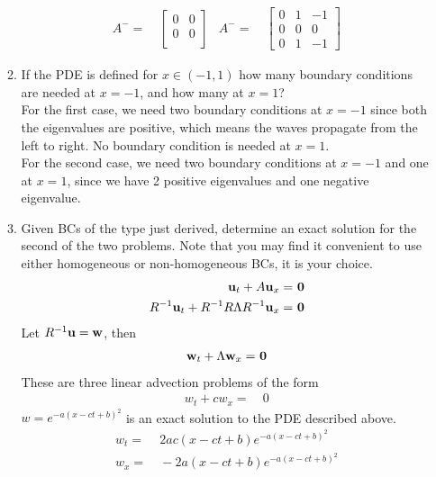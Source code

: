 \documentclass[11pt]{article}
\newcommand{\bu}{{\bf u}}
\newcommand{\bw}{{\bf w}}
\newcommand{\bra}[1]{\left(#1\right)}
\begin{document}
\begin{enumerate}
\begin{enumerate}
\begin{align*}
          A^{-} =& \ 
          \begin{bmatrix}
          0 & 0 \\
          0 & 0 \\
          \end{bmatrix} & 
          A^{-} =& \ 
          \begin{bmatrix}
          0 & 1 & -1 \\
          0 & 0 & 0 \\
          0 & 1 & -1
          \end{bmatrix}
      \end{align*}
    \item {\color{blue}If the PDE is defined for $x\in(-1,1)$ how many boundary conditions are needed at $x=-1$, and how many at $x=1$?} \\
    For the first case, we need two boundary conditions at $x=-1$ since both the eigenvalues are positive, which means the waves propagate from the left to right. No boundary condition is needed at $x=1$. \\
    For the second case, we need two boundary conditions at $x=-1$ and one at $x=1$, since we have 2 positive eigenvalues and one negative eigenvalue.
    \item {\color{blue}Given BCs of the type just derived, determine an exact solution for the second of the two problems. Note that you may find it convenient to use either homogeneous or non-homogeneous BCs, it is your choice.}\\
    \begin{align*}
        \bu_t + A\bu_x =& \ \bf{0} \\
        R^{-1}\bu_t + R^{-1}R\Lambda R^{-1}\bu_x =& \ \bf{0} 
    \end{align*}
    Let $R^{-1}\bu = \bw$, then
    \begin{align*}
        \bw_t + \Lambda \bw_x =& \ \bf{0} \\
    \end{align*}
    These are three linear advection problems of the form 
    \begin{align*}
        w_t + cw_x =& \ 0
    \end{align*}
    $w = e^{-a\bra{x-ct+b}^2}$ is an exact solution to the PDE described above. 
    \begin{align*}
        w_t =& \ 2ac\bra{x-ct+b}e^{-a\bra{x-ct+b}^2} \\
        w_x =& \ -2a\bra{x-ct+b}e^{-a\bra{x-ct+b}^2}
    \end{align*}

\end{enumerate}
\end{enumerate}
\end{document}
